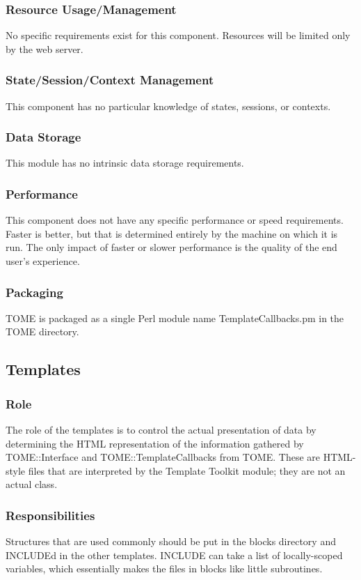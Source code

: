 \documentclass[12pt,titlepage]{article}
\begin{document}
\subsubsection{Resource Usage/Management}
No specific requirements exist for this component.  Resources will be limited only by the web server.
\subsubsection{State/Session/Context Management}
This component has no particular knowledge of states, sessions, or contexts.
\subsubsection{Data Storage}
This module has no intrinsic data storage requirements.
\subsubsection{Performance}
This component does not have any specific performance or speed requirements.  Faster is better, but that is determined entirely by the machine on which it is run.  The only impact of faster or slower performance is the quality of the end user's experience.
\subsubsection{Packaging}
TOME is packaged as a single Perl module name TemplateCallbacks.pm in the TOME directory.


\subsection{Templates}
\subsubsection{Role}
The role of the templates is to control the actual presentation of data by determining the HTML representation of the information gathered by TOME::Interface and TOME::TemplateCallbacks from TOME.  These are HTML-style files that are interpreted by the Template Toolkit module; they are not an actual class.
\subsubsection{Responsibilities}
Structures that are used commonly should be put in the blocks directory and INCLUDEd in the other templates. INCLUDE can take a list of locally-scoped variables, which essentially makes the files in blocks like little subroutines.
\end{document}
